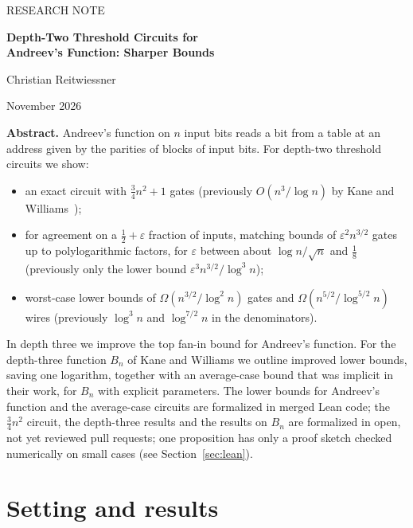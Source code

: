 \documentclass[11pt,letterpaper]{article}
\theoremstyle{remark}
\newcommand{\sect}[1]{\section{\texorpdfstring{\color{ink}#1}{#1}}}
\begin{document}
\thispagestyle{empty}
{\color{accent}\small RESEARCH NOTE\par}
\vspace{0.4em}
{\raggedright\color{ink}\LARGE\bfseries Depth-Two Threshold Circuits for\\[0.15em]
Andreev's Function: Sharper Bounds\par}
\vspace{0.5em}
{\large Christian Reitwiessner\par}
{\small November 2026\par}
\vspace{0.8em}

\begin{keybox}
\textbf{Abstract.} Andreev's function on $n$ input bits reads a bit from a
table at an address given by the parities of blocks of input bits. For
depth-two threshold circuits we show:
\begin{itemize}
\item an exact circuit with $\tfrac34 n^2+1$ gates (previously $O(n^3/\log n)$
      by Kane and Williams~\cite{KW});
\item for agreement on a $\tfrac12+\varepsilon$ fraction of inputs, matching
      bounds of $\varepsilon^2n^{3/2}$ gates up to polylogarithmic factors,
      for $\varepsilon$ between about $\log n/\sqrt n$ and $\tfrac18$
      (previously only the lower bound $\varepsilon^3n^{3/2}/\log^3n$);
\item worst-case lower bounds of $\Omega(n^{3/2}/\log^2 n)$ gates and
      $\Omega(n^{5/2}/\log^{5/2}n)$ wires (previously $\log^3 n$ and
      $\log^{7/2}n$ in the denominators).
\end{itemize}
In depth three we improve the top fan-in bound for Andreev's function. For
the depth-three function $B_n$ of Kane and Williams we outline improved
lower bounds, saving one logarithm, together with an average-case bound that
was implicit in their work, for $B_n$ with explicit parameters. The lower
bounds for Andreev's function and the average-case circuits are formalized in
merged Lean code; the $\tfrac34n^2$ circuit, the depth-three results and the
results on $B_n$ are formalized in open, not yet reviewed pull requests; one
proposition has only a proof sketch checked numerically on small cases (see
Section~\ref{sec:lean}).
\end{keybox}

\sect{Setting and results}
\end{document}
